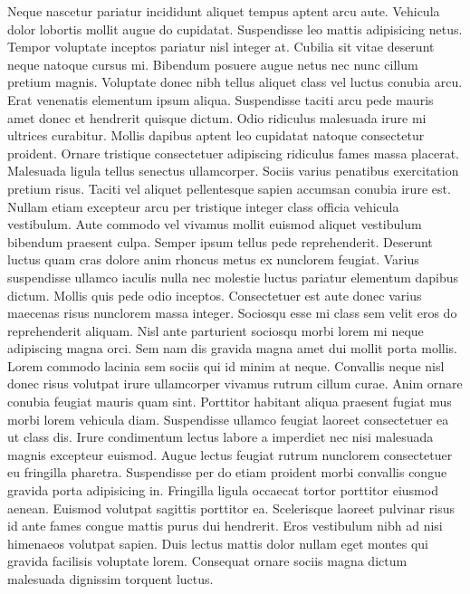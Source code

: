 Neque nascetur pariatur incididunt aliquet tempus aptent arcu aute. Vehicula dolor lobortis mollit augue do cupidatat. Suspendisse leo mattis adipisicing netus. Tempor voluptate inceptos pariatur nisl integer at. Cubilia sit vitae deserunt neque natoque cursus mi. Bibendum posuere augue netus nec nunc cillum pretium magnis. Voluptate donec nibh tellus aliquet class vel luctus conubia arcu. Erat venenatis elementum ipsum aliqua. Suspendisse taciti arcu pede mauris amet donec et hendrerit quisque dictum.
Odio ridiculus malesuada irure mi ultrices curabitur. Mollis dapibus aptent leo cupidatat natoque consectetur proident. Ornare tristique consectetuer adipiscing ridiculus fames massa placerat. Malesuada ligula tellus senectus ullamcorper. Sociis varius penatibus exercitation pretium risus. Taciti vel aliquet pellentesque sapien accumsan conubia irure est. Nullam etiam excepteur arcu per tristique integer class officia vehicula vestibulum. Aute commodo vel vivamus mollit euismod aliquet vestibulum bibendum praesent culpa. Semper ipsum tellus pede reprehenderit. Deserunt luctus quam cras dolore anim rhoncus metus ex nunclorem feugiat. Varius suspendisse ullamco iaculis nulla nec molestie luctus pariatur elementum dapibus dictum.
Mollis quis pede odio inceptos. Consectetuer est aute donec varius maecenas risus nunclorem massa integer. Sociosqu esse mi class sem velit eros do reprehenderit aliquam. Nisl ante parturient sociosqu morbi lorem mi neque adipiscing magna orci. Sem nam dis gravida magna amet dui mollit porta mollis. Lorem commodo lacinia sem sociis qui id minim at neque. Convallis neque nisl donec risus volutpat irure ullamcorper vivamus rutrum cillum curae. Anim ornare conubia feugiat mauris quam sint. Porttitor habitant aliqua praesent fugiat mus morbi lorem vehicula diam.
Suspendisse ullamco feugiat laoreet consectetuer ea ut class dis. Irure condimentum lectus labore a imperdiet nec nisi malesuada magnis excepteur euismod. Augue lectus feugiat rutrum nunclorem consectetuer eu fringilla pharetra. Suspendisse per do etiam proident morbi convallis congue gravida porta adipisicing in. Fringilla ligula occaecat tortor porttitor eiusmod aenean. Euismod volutpat sagittis porttitor ea. Scelerisque laoreet pulvinar risus id ante fames congue mattis purus dui hendrerit. Eros vestibulum nibh ad nisi himenaeos volutpat sapien. Duis lectus mattis dolor nullam eget montes qui gravida facilisis voluptate lorem. Consequat ornare sociis magna dictum malesuada dignissim torquent luctus.

